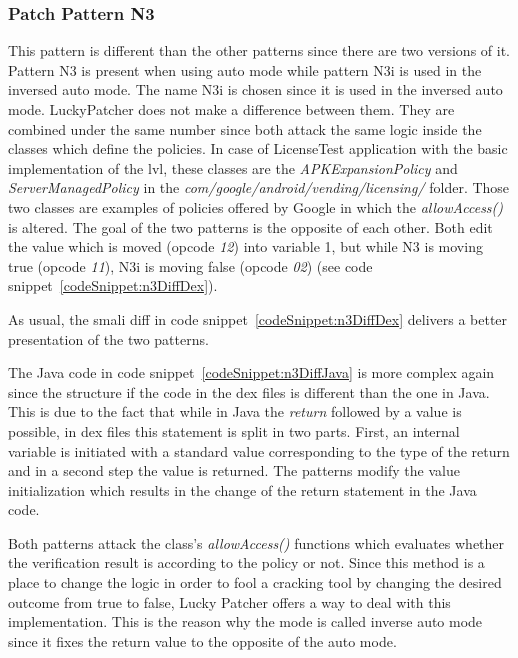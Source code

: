 \subsubsection{Patch Pattern N3}
This pattern is different than the other patterns since there are two versions of it.
Pattern N3 is present when using auto mode while pattern N3i is used in the inversed auto mode.
The name N3i is chosen since it is used in the inversed auto mode.
LuckyPatcher does not make a difference between them.
They are combined under the same number since both attack the same logic inside the classes which define the policies.
In case of LicenseTest application with the basic implementation of the \gls{lvl}, these classes are the \textit{APKExpansionPolicy} and \textit{ServerManagedPolicy} in the  \textit{com/google/android/vending/licensing/} folder.
Those two classes are examples of policies offered by Google \cite{developersLicensingReference} in which the \textit{allowAccess()} is altered.
\newline
The goal of the two patterns is the opposite of each other.
Both edit the value which is moved (opcode \textit{12}) into variable 1, but while N3 is moving true (opcode \textit{11}), N3i is moving false (opcode \textit{02}) (see code snippet~\ref{codeSnippet:n3DiffDex}).
\newline

As usual, the smali diff in code snippet~\ref{codeSnippet:n3DiffDex} delivers a better presentation of the two patterns.
\newline

The Java code in code snippet~\ref{codeSnippet:n3DiffJava} is more complex again since the structure if the code in the \gls{dex} files is different than the one in Java.
This is due to the fact that while in Java the \textit{return} followed by a value is possible, in \gls{dex} files this statement is split in two parts.
First, an internal variable is initiated with a standard value corresponding to the type of the return and in a second step the value is returned.
The patterns modify the value initialization which results in the change of the return statement in the Java code.
\newline

Both patterns attack the class's \textit{allowAccess()} functions which evaluates whether the verification result is according to the policy or not.
Since this method is a place to change the logic in order to fool a cracking tool by changing the desired outcome from true to false, Lucky Patcher offers a way to deal with this implementation.
This is the reason why the mode is called inverse auto mode since it fixes the return value to the opposite of the auto mode.


